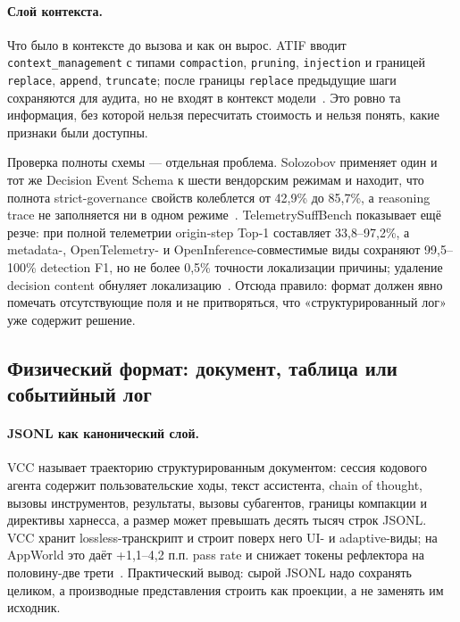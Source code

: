 \documentclass[11pt,a4paper]{article}
\begin{document}
\paragraph{Слой контекста.} Что было в контексте до вызова и как он вырос.
ATIF вводит \texttt{context\_management} с типами \texttt{compaction},
\texttt{pruning}, \texttt{injection} и границей \texttt{replace},
\texttt{append}, \texttt{truncate}; после границы \texttt{replace}
предыдущие шаги сохраняются для аудита, но не входят в контекст
модели~\cite{atif2026}. Это ровно та информация, без которой нельзя
пересчитать стоимость и нельзя понять, какие признаки были доступны.

Проверка полноты схемы — отдельная проблема. Solozobov применяет один и
тот же Decision Event Schema к шести вендорским режимам и находит, что
полнота strict-governance свойств колеблется от 42,9\% до 85,7\%, а
reasoning trace не заполняется ни в одном режиме~\cite{solozobov2026reconstruct}.
TelemetrySuffBench показывает ещё резче: при полной телеметрии origin-step
Top-1 составляет 33,8--97,2\%, а metadata-, OpenTelemetry- и
OpenInference-совместимые виды сохраняют 99,5--100\% detection F1, но не
более 0,5\% точности локализации причины; удаление decision content
обнуляет локализацию~\cite{zhu2026telemetrysuff}. Отсюда правило: формат
должен явно помечать отсутствующие поля и не притворяться, что
«структурированный лог» уже содержит решение.

\subsection{Физический формат: документ, таблица или событийный лог}

\paragraph{JSONL как канонический слой.}
VCC называет траекторию структурированным документом: сессия кодового
агента содержит пользовательские ходы, текст ассистента, chain of thought,
вызовы инструментов, результаты, вызовы субагентов, границы компакции и
директивы харнесса, а размер может превышать десять тысяч строк JSONL.
VCC хранит lossless-транскрипт и строит поверх него UI- и adaptive-виды;
на AppWorld это даёт +1,1--4,2 п.п. pass rate и снижает токены рефлектора
на половину-две трети~\cite{zhang2026vcc}. Практический вывод: сырой JSONL
надо сохранять целиком, а производные представления строить как проекции,
а не заменять им исходник.
\end{document}
